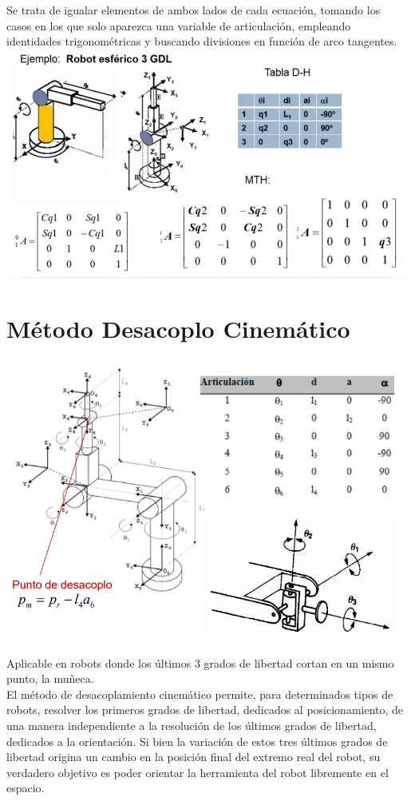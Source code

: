\documentclass[11pt,a4paper,oldfontcommands,oneside]{memoir}
\begin{document}
Se trata de igualar elementos de ambos lados de cada ecuación, tomando los casos en los que solo aparezca una variable de articulación, empleando identidades trigonométricas y buscando divisiones en función de arco tangentes. \\

\includegraphics[scale=.5]{robot.png} \\

\chapter{Método Desacoplo Cinemático}
\begin{center}
\includegraphics[scale=.5]{robot22}
\end{center}
 

Aplicable en robots donde los últimos 3 grados de libertad cortan en un mismo punto, la muñeca.\\

El método de desacoplamiento cinemático permite, para determinados tipos de robots, resolver los primeros grados de libertad, dedicados al posicionamiento, de una manera independiente a la resolución de los últimos grados de libertad, dedicados a la orientación. Si bien la variación de estos tres últimos grados de libertad origina un cambio en la posición final del extremo real del robot, su verdadero objetivo es poder orientar la herramienta del robot libremente en el espacio. \\
\end{document}
